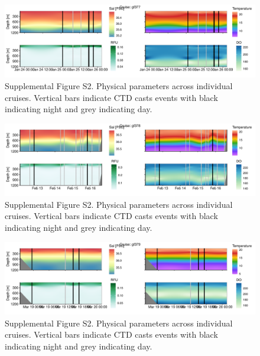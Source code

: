 \documentclass[
]{article}
\begin{document}
\begin{figure}

{\centering \includegraphics[width=1\textwidth,height=\textheight]{index_files/figure-pdf/unnamed-chunk-19-8.pdf}

}

\caption{Supplemental Figure S2. Physical parameters across individual
cruises. Vertical bars indicate CTD casts events with black indicating
night and grey indicating day.}

\end{figure}

\begin{figure}

{\centering \includegraphics[width=1\textwidth,height=\textheight]{index_files/figure-pdf/unnamed-chunk-19-9.pdf}

}

\caption{Supplemental Figure S2. Physical parameters across individual
cruises. Vertical bars indicate CTD casts events with black indicating
night and grey indicating day.}

\end{figure}

\begin{figure}

{\centering \includegraphics[width=1\textwidth,height=\textheight]{index_files/figure-pdf/unnamed-chunk-19-10.pdf}

}

\caption{Supplemental Figure S2. Physical parameters across individual
cruises. Vertical bars indicate CTD casts events with black indicating
night and grey indicating day.}

\end{figure}
\end{document}
